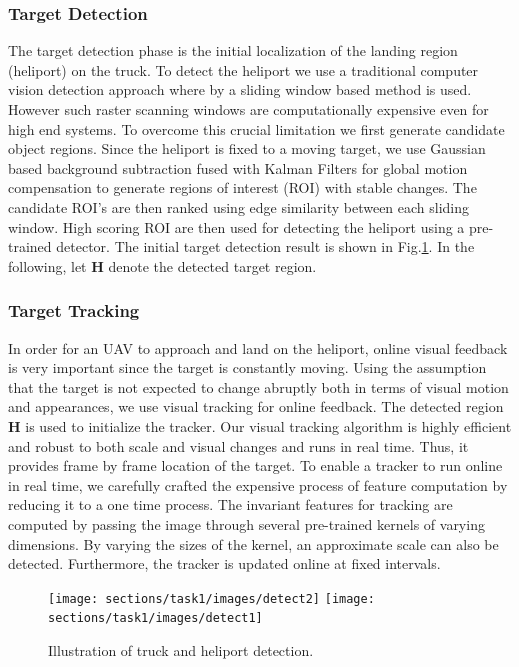 \documentclass{standalone}
\begin{document}
\subsubsection{Target Detection}
The target detection phase is the initial localization of the landing
region (heliport) on the truck. To detect the heliport we use a
traditional computer vision detection approach where by a sliding
window based method is used. However such raster scanning windows are
computationally expensive even for high end systems. To overcome this
crucial limitation we first generate candidate object
regions. Since the heliport is fixed to a moving target, we use
Gaussian based background subtraction fused with Kalman Filters for 
global motion compensation to generate regions of interest
(ROI)  with stable changes. The candidate ROI's are then ranked using
edge similarity between each sliding window. High scoring ROI are then
used for detecting the heliport using a pre-trained
detector. The initial target detection result is shown in Fig.\ref{fig:detection}.
In the following, let $\mathbf{H}$ denote the detected target region.

\subsubsection{Target Tracking}

In order for an UAV to approach and land on the heliport, online visual
feedback is very important since the target is constantly moving.
Using the assumption that the target is not
expected to change abruptly both in terms of visual motion and
appearances, we use visual tracking for online feedback.
The detected region $\mathbf{H}$ is used to initialize the
tracker. Our visual tracking algorithm is highly efficient and robust
to both scale and visual changes and runs in real time. Thus, it provides frame by frame location of the target. To enable a tracker
to run online in real time, we carefully crafted the expensive process
of feature computation by reducing it to a one time process. 
The invariant features for tracking are computed by passing the image
through several pre-trained kernels of varying dimensions. By varying
the sizes of the kernel, an approximate scale can also be detected.
Furthermore, the tracker is updated online at fixed intervals.

\begin{figure}[b!]
  \centering
  \texttt{[image: sections/task1/images/detect2]}
  \texttt{[image: sections/task1/images/detect1]}
  \caption{Illustration of truck and heliport detection.}
  \label{fig:detection}
\end{figure}
\end{document}
